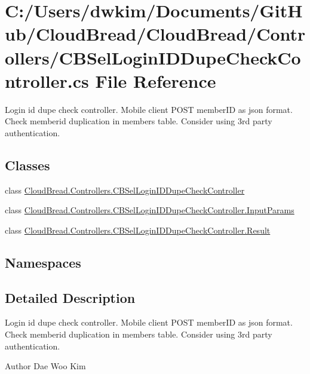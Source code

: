 \hypertarget{a00221}{}\section{C\+:/\+Users/dwkim/\+Documents/\+Git\+Hub/\+Cloud\+Bread/\+Cloud\+Bread/\+Controllers/\+C\+B\+Sel\+Login\+I\+D\+Dupe\+Check\+Controller.cs File Reference}
\label{a00221}


Login id dupe check controller. Mobile client P\+O\+ST member\+ID as json format. ~\newline
Check memberid duplication in members table. Consider using 3rd party authentication.  


\subsection*{Classes}
\begin{DoxyCompactItemize}
\item 
class \hyperlink{a00050}{Cloud\+Bread.\+Controllers.\+C\+B\+Sel\+Login\+I\+D\+Dupe\+Check\+Controller}
\item 
class \hyperlink{a00091}{Cloud\+Bread.\+Controllers.\+C\+B\+Sel\+Login\+I\+D\+Dupe\+Check\+Controller.\+Input\+Params}
\item 
class \hyperlink{a00174}{Cloud\+Bread.\+Controllers.\+C\+B\+Sel\+Login\+I\+D\+Dupe\+Check\+Controller.\+Result}
\end{DoxyCompactItemize}
\subsection*{Namespaces}
\begin{DoxyCompactItemize}
\end{DoxyCompactItemize}


\subsection{Detailed Description}
Login id dupe check controller. Mobile client P\+O\+ST member\+ID as json format. ~\newline
Check memberid duplication in members table. Consider using 3rd party authentication. 

\begin{DoxyAuthor}{Author}
Dae Woo Kim 
\end{DoxyAuthor}

